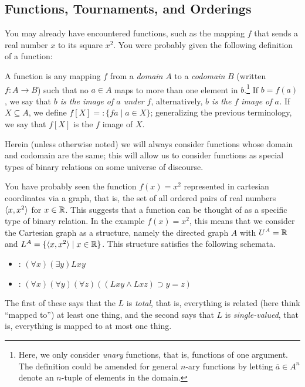 \subsection*{Functions, Tournaments, and Orderings}
You may already have encountered functions, such as the mapping $f$ that sends a real number $x$ to its square $x^2$. You were probably given the following definition of a function:

\begin{definition}
A function is any mapping $f$ from a \emph{domain} $A$ to a \emph{codomain} $B$ (written $f: A \rightarrow B$) such that no $a \in A$ maps to more than one element in $b$.\footnote{Here, we only consider \emph{unary} functions, that is, functions of one argument. The definition could be amended for general $n$-ary functions by letting $\overline{a} \in A^n$ denote an $n$-tuple of elements in the domain.} If $b=f(a)$, we say that \emph{$b$ is the image of $a$ under $f$}, alternatively, \emph{$b$ is the $f$ image of $a$.} If $X\subseteq A$, we define $f[X]=:\{f{a}\mid a\in X\}$; generalizing the previous terminology, we say that $f[X]$ is the $f$ image of $X$.
\end{definition}

Herein (unless otherwise noted) we will always consider functions whose domain and codomain are the same; this will allow us to consider functions as special types of binary relations on some universe of discourse. 

You have probably seen the function $f(x) = x^2$ represented in cartesian coordinates via a graph, that is, the set of all ordered pairs of real numbers $\mbox{$\langle x,x^2 \rangle$}$ for $x\in\mbox{$\mathbb{R}$}$. This suggests that a function can be thought of as a specific type of binary relation. In the example $f(x) = x^2$, this means that we consider the Cartesian graph as a structure, namely the directed graph $A$ with $U^A=\mbox{$\mathbb{R}$}$ and $L^A=\{\mbox{$\langle x,x^2 \rangle$} \mid x\in\mbox{$\mathbb{R}$}\}$. This structure satisfies the following schemata.
\begin{itemize}
\item
\tot: $(\forall x)(\exists y)Lxy$
\item
\sv: $(\forall x)(\forall y)(\forall z)((Lxy\wedge Lxz)\supset y=z)$
\end{itemize}

The first of these says that the $L$ is \emph{total}, that is, everything is related (here think ``mapped to'') at least one thing, and the second says that $L$ is \emph{single-valued}, that is, everything is mapped to at most one thing. 

